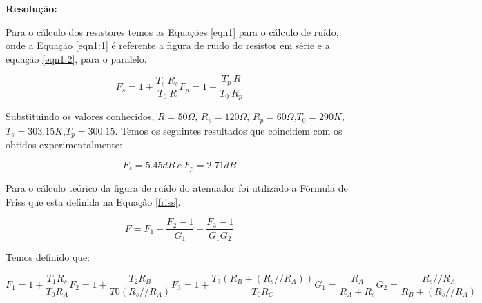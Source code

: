 \documentclass[a4paper,12pt]{proc}
\begin{document}
\textbf{Resolução:}

\singlespacing

\noindent Para o cálculo dos resistores temos as Equações \ref{eqn1} para o cálculo de ruído, onde a Equação \ref{eqn1:1} é referente a figura de ruido do resistor em série e a equação \ref{eqn1:2}, para o paralelo.


\begin{subequations}
\label{eqn1}
    \begin{equation}
        F_{s} = 1 + \frac{T_{s}~R_{s}}{T_{0}~R}
        \label{eqn1:1}
    \end{equation}
    \begin{equation}
        F_{p} = 1 + \frac{T_{p}~R}{T_{0}~R_{p}}
        \label{eqn1:2}
    \end{equation}
\end{subequations}


\noindent Substituindo os valores conhecidos, $R=50\Omega$, $R_{s}=120\Omega$, $R_{p}=60\Omega$,$T_{0}=290K$,$T_{s}=303.15K$,$T_{p}=300.15$. Temos os seguintes resultados que coincidem com os obtidos experimentalmente:

\[F_{s} = 5.45 dB ~e~ F_{p} = 2.71 dB\]

\singlespacing

\noindent Para o cálculo teórico da figura de ruído do atenuador foi utilizado a Fórmula de Friss que esta definida na Equação \ref{friss}.

\begin{equation}
    F = F_{1} + \frac{F_{2}-1}{G_{1}} + \frac{F_{3}-1}{G_{1}G_{2}}
    \label{friss}
\end{equation}

\noindent Temos definido que:

\begin{subequations}
    \begin{equation}
        F_{1} = 1 + \frac{T_{1}R_{s}}{T_{0}R_{A}}
    \end{equation}
    \begin{equation}
        F_{2} = 1 + \frac{T_{2}R_{B}}{T{0}(R_{s}//R_{A})}
    \end{equation}
    \begin{equation}
        F_{3} = 1 + \frac{T_{3}(R_{B}+(R_{s}//R_{A}))}{T_{0}R_{C}}
    \end{equation}
    \begin{equation}
        G_{1} = \frac{R_{A}}{R_{A}+R_{s}}
    \end{equation}
    \begin{equation}
        G_{2} = \frac{R_{s}//R_{A}}{R_{B}+(R_{s}//R_{A})}
    \end{equation}
\end{subequations}
\end{document}
